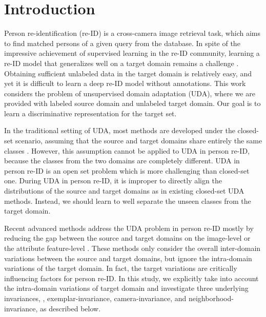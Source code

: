 \documentclass[10pt,twocolumn,letterpaper]{article}
\begin{document}
\section{Introduction}

Person re-identification (re-ID) \cite{zheng2016personsurvery,zhong2017re,wu2019progressive,Li_2018_CVPR} is a cross-camera image retrieval task, which aims to find matched persons of a given query from the database. 
In spite of the impressive achievement of supervised learning in the re-ID community, learning a re-ID model that generalizes well on a target domain remains a challenge \cite{deng2018image,wang2018reid}.
Obtaining sufficient unlabeled data in the target domain is relatively easy, and yet it is difficult to learn a deep re-ID model without annotations.
This work considers the problem of unsupervised domain adaptation (UDA), where we are provided with labeled source domain and unlabeled target domain.
Our goal is to learn a discriminative representation for the target set. 


\vspace{-.007in}
In the traditional setting of UDA, most methods are developed under the closed-set scenario, assuming that the source and target domains share entirely the same classes \cite{tzeng2017adversarial,ganin2015unsupervised}. 
However, this assumption cannot be applied to UDA in person re-ID, because the classes from the two domains are completely different. UDA in person re-ID is an open set problem \cite{busto2017open-set} which is more challenging than closed-set one. 
During UDA in person re-ID, it is improper to directly align the distributions of the source and target domains as in existing closed-set UDA methods. Instead, we should learn to well separate the unseen classes from the target domain. 


\vspace{-.007in}
Recent advanced methods address the UDA problem in person re-ID mostly by reducing the gap between the source and target domains on the image-level \cite{deng2018image,wei2018person,Bak_2018_ECCV} or the attribute feature-level \cite{wang2018reid,lin2018multibmvc}.  
These methods only consider the overall inter-domain variations between the source and target domains, but ignore the intra-domain variations of the target domain. In fact, the target variations are critically influencing factors for person re-ID. 
In this study, we explicitly take into account the intra-domain variations of target domain and investigate three underlying invariances, \ie, exemplar-invariance, camera-invariance, and neighborhood-invariance, as described below.
\end{document}

